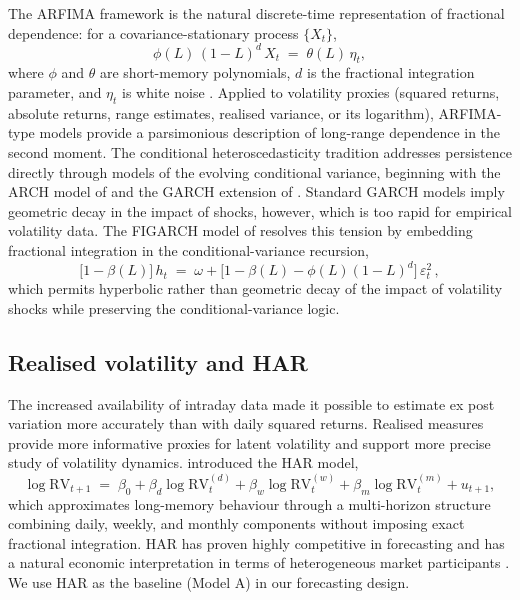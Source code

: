 \documentclass[11pt,a4paper]{article}
\begin{document}
The ARFIMA framework is the natural discrete-time representation of
fractional dependence: for a covariance-stationary process $\{X_t\}$,
\begin{equation}
  \phi(L)\, (1-L)^d\, X_t \;=\; \theta(L)\,\eta_t,
\end{equation}
where $\phi$ and $\theta$ are short-memory polynomials, $d$ is the
fractional integration parameter, and $\eta_t$ is white noise
\citep{granger1980introduction,hosking1981fractional}. Applied to
volatility proxies (squared returns, absolute returns, range estimates,
realised variance, or its logarithm), ARFIMA-type models provide a
parsimonious description of long-range dependence in the second moment.
The conditional heteroscedasticity tradition addresses persistence
directly through models of the evolving conditional variance, beginning
with the ARCH model of \citet{engle1982autoregressive} and the GARCH
extension of \citet{bollerslev1986generalized}. Standard GARCH models
imply geometric decay in the impact of shocks, however, which is too
rapid for empirical volatility data. The FIGARCH model of
\citet{baillie1996fractionally} resolves this tension by embedding
fractional integration in the conditional-variance recursion,
\begin{equation}
  \bigl[1 - \beta(L)\bigr]\, h_t \;=\; \omega
  + \bigl[1 - \beta(L) - \phi(L)(1-L)^d\bigr]\, \varepsilon_t^2 \,,
\end{equation}
which permits hyperbolic rather than geometric decay of the impact of
volatility shocks while preserving the conditional-variance logic.

\subsection{Realised volatility and HAR}

The increased availability of intraday data made it possible to estimate
ex post variation more accurately than with daily squared returns.
Realised measures \citep{andersen2003modeling,barndorff2002econometric}
provide more informative proxies for latent volatility and support more
precise study of volatility dynamics. \citet{corsi2009simple} introduced
the HAR model,
\begin{equation}
  \log \mathrm{RV}_{t+1} \;=\; \beta_0 + \beta_d \log \mathrm{RV}^{(d)}_t
  + \beta_w \log \mathrm{RV}^{(w)}_t
  + \beta_m \log \mathrm{RV}^{(m)}_t
  + u_{t+1},
\end{equation}
which approximates long-memory behaviour through a multi-horizon structure
combining daily, weekly, and monthly components without imposing exact
fractional integration. HAR has proven highly competitive in forecasting
and has a natural economic interpretation in terms of heterogeneous
market participants \citep{muller1997volatilities}. We use HAR as the
baseline (Model A) in our forecasting design.
\end{document}
